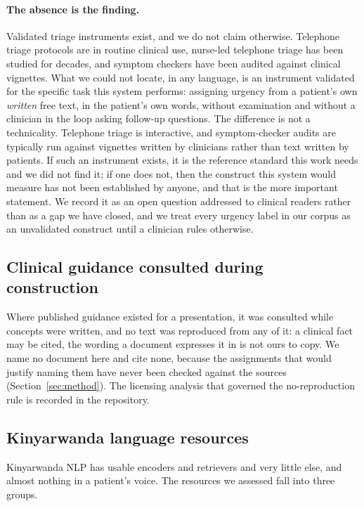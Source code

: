 \paragraph{The absence is the finding.} Validated triage instruments exist, and
we do not claim otherwise. Telephone triage protocols are in routine clinical
use, nurse-led telephone triage has been studied for decades, and symptom
checkers have been audited against clinical vignettes. What we could not locate,
in any language, is an instrument validated for the specific task this system
performs: assigning urgency from a patient's own \emph{written} free text, in the
patient's own words, without examination and without a clinician in the loop
asking follow-up questions. The difference is not a technicality. Telephone
triage is interactive, and symptom-checker audits are typically run against
vignettes written by clinicians rather than text written by patients. If such an
instrument exists, it is the reference standard this
work needs and we did not find it; if one does not, then the construct this
system would measure has not been established by anyone, and that is the more
important statement. We record it as an open question addressed to clinical
readers rather than as a gap we have closed, and we treat every urgency label in
our corpus as an unvalidated construct until a clinician rules otherwise.

\subsection{Clinical guidance consulted during construction}

Where published guidance existed for a presentation, it was consulted while
concepts were written, and no text was reproduced from any of it: a clinical fact
may be cited, the wording a document expresses it in is not ours to copy. We name
no document here and cite none, because the assignments that would justify naming
them have never been checked against the sources (Section~\ref{sec:method}). The
licensing analysis that governed the no-reproduction rule is recorded in the
repository.

\subsection{Kinyarwanda language resources}

Kinyarwanda NLP has usable encoders and retrievers and very little else, and
almost nothing in a patient's voice. The resources we assessed fall into three
groups.

